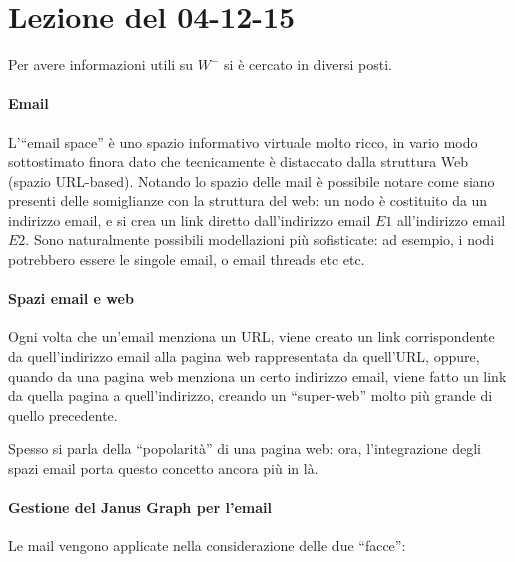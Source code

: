 \section{Lezione del 04-12-15}

Per avere informazioni utili su $W^-$ si \`e cercato in diversi posti.

\paragraph*{Email}L'``email space'' \`e uno spazio informativo virtuale molto ricco, in vario modo sottostimato finora dato che tecnicamente \`e distaccato dalla struttura Web (spazio URL-based). Notando lo spazio delle mail \`e possibile notare come siano presenti delle somiglianze con la struttura del web: un nodo \`e costituito da un indirizzo email, e si crea un link diretto dall'indirizzo email $E1$ all'indirizzo email $E2$. Sono naturalmente possibili modellazioni pi\`u sofisticate: ad esempio, i nodi potrebbero essere le singole email, o email threads etc etc.

\paragraph*{Spazi email e web}

Ogni volta che un'email menziona un URL, viene creato un link corrispondente da quell'indirizzo email alla pagina web rappresentata da quell'URL, oppure, quando da una pagina web menziona un certo indirizzo email, viene fatto un link da quella pagina a quell'indirizzo, creando un ``super-web'' molto pi\`u grande di quello precedente.

Spesso si parla della ``popolarit\`a'' di una pagina web: ora, l'integrazione degli spazi email porta questo concetto ancora pi\`u in l\`a.

\paragraph*{Gestione del Janus Graph per l'email}

Le mail vengono applicate nella considerazione delle due ``facce'':

